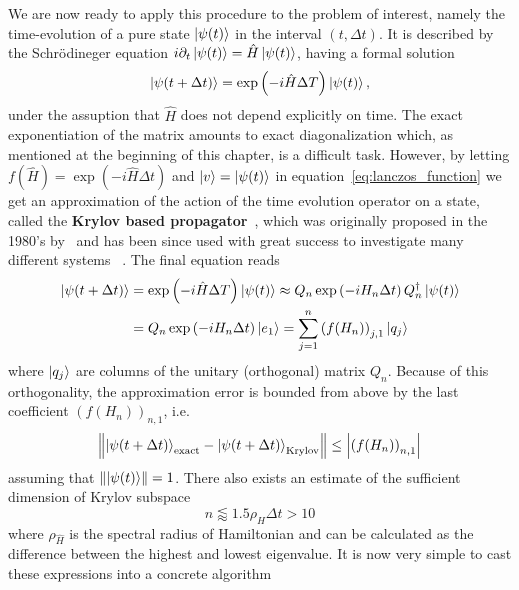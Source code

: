 We are now ready to apply this procedure to the problem of interest, namely the time-evolution of a pure
state \(\ket{\psi(t)}\) in the interval \(\left(t, \Delta t\right)\). It is described by the Schr{\"o}dineger equation
\(i\partial_t \ket{\psi(t)} = \hat{H} \ket{\psi(t)}\), having a formal solution
\begin{equation}
	\ket{\psi(t+\Delta t)} = \exp\left(-i \hat{H} \Delta T\right) \ket{\psi(t)},	
\end{equation}
under the assuption that \(\hat{H}\) does not depend explicitly on time. The exact exponentiation of the matrix amounts to exact
diagonalization which, as mentioned at the beginning of this chapter, is a difficult task. However, by letting \(f(\hat{H}) = 
\exp\left(-i \hat{H} \Delta t\right)\) and \(\ket{v} = \ket{\psi(t)}\) in equation~\eqref{eq:lanczos_function} we
get an approximation of the action of the time
evolution operator on a state, called the \textbf{Krylov based propagator}~\autocite{Moler2003}, which was 
originally proposed in the 1980's by~\textcite{Park1986} and has been since used with great success to 
investigate many different systems ~\autocite{Schmitteckert2004,Stanek2013,Zaletel2015,Dargel2012}. The final equation
reads
\begin{align}
	\ket{\psi(t+\Delta t)} &= \exp\left(-i \hat{H} \Delta T\right) \ket{\psi(t)} \approx
	Q_n \exp\left(-i H_n \Delta t\right) Q_n^{\dagger}\ket{\psi(t)}\\
	 &= Q_n \exp\left(-i H_n \Delta t\right) \ket{e_1} = \sum_{j=1}^{n} \left(f(H_n)\right)_{j,1} \ket{q_j}
\end{align} 
where \(\ket{q_j}\) are columns of the unitary (orthogonal) matrix \(Q_n\). Because of this orthogonality,
the approximation error is bounded from above by the last coefficient \(\left(f(H_n)\right)_{n,1}\), i.e.
\begin{equation}
	\norm{\ket{\psi(t+\Delta t)}_{\textrm{exact}} - \ket{\psi(t+\Delta t)}_{\textrm{Krylov}}} \leq \abs{\left(f(H_n)\right)_{n,1}}
\end{equation}
assuming that \(\norm{\ket{\psi(t)}} = 1\). There also exists an estimate of the sufficient dimension of Krylov
subspace~\autocite{Mohankumar2006}
\begin{equation}
	n \lessapprox 1.5 \rho_{\hat{H}} \Delta t > 10
\end{equation}
where \(\rho_{\hat{H}}\) is the spectral radius of Hamiltonian and can be calculated as the difference between the highest and lowest eigenvalue.
It is now very simple to cast these expressions into a concrete algorithm

